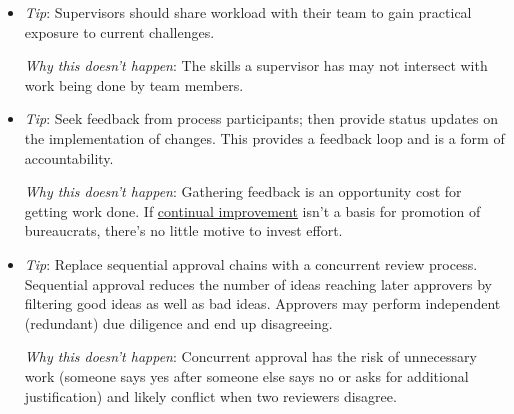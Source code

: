 \begin{itemize}
    \item \textit{Tip}: Supervisors should share workload with their team to gain practical exposure to current challenges.

    \textit{Why this doesn't happen}: The skills a supervisor has may not intersect with work being done by team members. 
    
    \item \textit{Tip}: Seek feedback from process participants; then provide status updates on the implementation of changes. This provides a feedback loop and is a form of accountability.

    \textit{Why this doesn't happen}: Gathering feedback is an opportunity cost for getting work done. If \href{https://en.wikipedia.org/wiki/Continual_improvement_process}{continual improvement}
    isn't a basis for promotion of bureaucrats, there's no little motive to invest effort.
    
    \item \textit{Tip}: Replace sequential approval chains with a concurrent review process. Sequential approval reduces the number of ideas reaching later approvers by filtering good ideas as well as bad ideas. Approvers may perform independent (redundant) due diligence and end up disagreeing. 
    
    \textit{Why this doesn't happen}: Concurrent approval has the risk of unnecessary work (someone says yes after someone else says no or asks for additional justification) and likely conflict when two reviewers disagree. 
\end{itemize}

